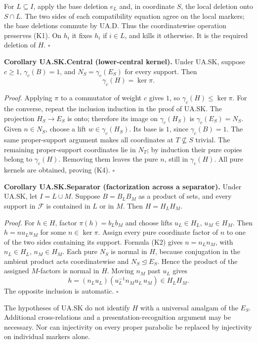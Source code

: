 \documentclass[
  11pt,
  a4paper,
]{article}
\begin{document}
For \(L\subseteq I\), apply the base deletion \(e_L\) and, in coordinate
\(S\), the local deletion onto \(S\cap L\). The two sides of each
compatibility equation agree on the local markers; the base deletions
commute by UA.D. Thus the coordinatewise operation preserves (K1). On
\(h_i\) it fixes \(h_i\) if \(i\in L\), and kills it otherwise. It is
the required deletion of \(H\). \(\square\)

\textbf{Corollary UA.SK.Central (lower-central kernel).} Under UA.SK,
suppose \(c\geq1\), \(\gamma_c(B)=1\), and \(N_S=\gamma_c(E_S)\) for
every support. Then \[
\gamma_c(H)=\ker\pi.
\tag{K4}
\]

\emph{Proof.} Applying \(\pi\) to a commutator of weight \(c\) gives
\(1\), so \(\gamma_c(H)\leq\ker\pi\). For the converse, repeat the
inclusion induction in the proof of UA.SK. The projection \(H_S\to E_S\)
is onto; therefore its image on \(\gamma_c(H_S)\) is
\(\gamma_c(E_S)=N_S\). Given \(n\in N_S\), choose a lift
\(w\in\gamma_c(H_S)\). Its base is \(1\), since \(\gamma_c(B)=1\). The
same proper-support argument makes all coordinates at
\(T\not\subseteq S\) trivial. The remaining proper-support coordinates
lie in \(N_T\); by induction their pure copies belong to
\(\gamma_c(H)\). Removing them leaves the pure \(n\), still in
\(\gamma_c(H)\). All pure kernels are obtained, proving (K4).
\(\square\)

\textbf{Corollary UA.SK.Separator (factorization across a separator).}
Under UA.SK, let \(I=L\cup M\). Suppose \(B=B_LB_M\) as a product of
sets, and every support in \(\mathcal F\) is contained in \(L\) or in
\(M\). Then \(H=H_LH_M\).

\emph{Proof.} For \(h\in H\), factor \(\pi(h)=b_Lb_M\) and choose lifts
\(u_L\in H_L\), \(u_M\in H_M\). Then \(h=n u_Lu_M\) for some
\(n\in\ker\pi\). Assign every pure coordinate factor of \(n\) to one of
the two sides containing its support. Formula (K2) gives \(n=n_Ln_M\),
with \(n_L\in H_L\), \(n_M\in H_M\). Each pure \(N_S\) is normal in
\(H\), because conjugation in the ambient product acts coordinatewise
and \(N_S\unlhd E_S\). Hence the product of the assigned \(M\)-factors
is normal in \(H\). Moving \(n_M\) past \(u_L\) gives \[
h=(n_Lu_L)(u_L^{-1}n_Mu_L\,u_M)\in H_LH_M.
\] The opposite inclusion is automatic. \(\square\)

The hypotheses of UA.SK do not identify \(H\) with a universal amalgam
of the \(E_S\). Additional cross-relations and a
presentation-recognition argument may be necessary. Nor can injectivity
on every proper parabolic be replaced by injectivity on individual
markers alone.
\end{document}
